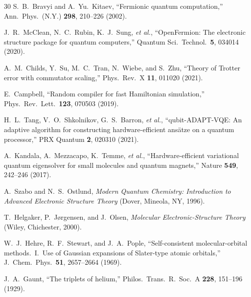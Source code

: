 \documentclass[aps,pra,twocolumn,superscriptaddress,longbibliography]{revtex4-2}
\begin{document}
\begin{thebibliography}{30}
S.~B.~Bravyi and A.~Yu.~Kitaev,
``Fermionic quantum computation,''
Ann.\ Phys.\ (N.Y.) \textbf{298}, 210--226 (2002).


J.~R.~McClean, N.~C.~Rubin, K.~J.~Sung, \textit{et al.},
``OpenFermion: The electronic structure package for quantum computers,''
Quantum Sci.\ Technol.\ \textbf{5}, 034014 (2020).


A.~M.~Childs, Y.~Su, M.~C.~Tran, N.~Wiebe, and S.~Zhu,
``Theory of Trotter error with commutator scaling,''
Phys.\ Rev.\ X \textbf{11}, 011020 (2021).

E.~Campbell,
``Random compiler for fast Hamiltonian simulation,''
Phys.\ Rev.\ Lett.\ \textbf{123}, 070503 (2019).


H.~L.~Tang, V.~O.~Shkolnikov, G.~S.~Barron, \textit{et al.},
``qubit-ADAPT-VQE: An adaptive algorithm for constructing hardware-efficient
ans\"atze on a quantum processor,''
PRX Quantum \textbf{2}, 020310 (2021).

A.~Kandala, A.~Mezzacapo, K.~Temme, \textit{et al.},
``Hardware-efficient variational quantum eigensolver for small molecules and
quantum magnets,''
Nature \textbf{549}, 242--246 (2017).


A.~Szabo and N.~S.~Ostlund,
\textit{Modern Quantum Chemistry: Introduction to Advanced Electronic
Structure Theory}
(Dover, Mineola, NY, 1996).

T.~Helgaker, P.~J{\o}rgensen, and J.~Olsen,
\textit{Molecular Electronic-Structure Theory}
(Wiley, Chichester, 2000).


W.~J.~Hehre, R.~F.~Stewart, and J.~A.~Pople,
``Self-consistent molecular-orbital methods.\ I.\ Use of Gaussian
expansions of Slater-type atomic orbitals,''
J.\ Chem.\ Phys.\ \textbf{51}, 2657--2664 (1969).


J.~A.~Gaunt,
``The triplets of helium,''
Philos.\ Trans.\ R.\ Soc.\ A \textbf{228}, 151--196 (1929).


\end{thebibliography}
\end{document}
